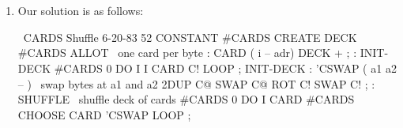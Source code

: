 \section{}

\ifeightyfour\begin{enumerate}
\item\fi Our solution is as follows:
\begin{Code}
\ CARDS Shuffle                              6-20-83
52 CONSTANT #CARDS
CREATE DECK  #CARDS ALLOT   \ one card per byte
: CARD ( i -- adr) DECK + ;
: INIT-DECK  #CARDS 0 DO  I  I CARD  C!  LOOP ;
INIT-DECK
: 'CSWAP  ( a1 a2 -- )  \  swap bytes at a1 and a2
   2DUP C@  SWAP C@  ROT C!  SWAP C! ;
: SHUFFLE   \  shuffle deck of cards
   #CARDS 0 DO  I CARD  #CARDS CHOOSE CARD  'CSWAP
   LOOP ;
\end{Code}
\ifeightyfour\end{enumerate}\fi

